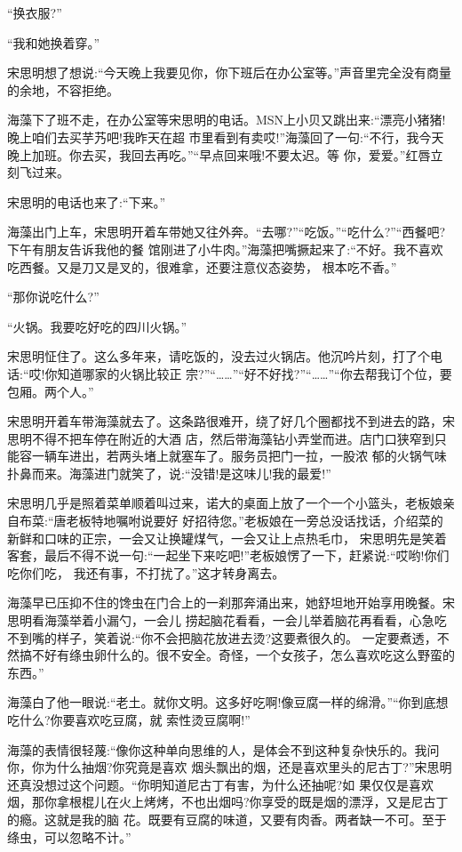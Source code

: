 \documentclass[11pt,a4paper,onecolumn]{article}
\begin{document}
``换衣服?''

``我和她换着穿。''

宋思明想了想说:``今天晚上我要见你，你下班后在办公室等。''声音里完全没有商量的余地，不容拒绝。

海藻下了班不走，在办公室等宋思明的电话。MSN上小贝又跳出来:``漂亮小猪猪!晚上咱们去买芋艿吧!我昨天在超
市里看到有卖哎!''海藻回了一句:``不行，我今天晚上加班。你去买，我回去再吃。''``早点回来哦!不要太迟。等
你，爱爱。''红唇立刻飞过来。

宋思明的电话也来了:``下来。''

海藻出门上车，宋思明开着车带她又往外奔。``去哪?''``吃饭。''``吃什么?''``西餐吧?下午有朋友告诉我他的餐
馆刚进了小牛肉。''海藻把嘴撅起来了:``不好。我不喜欢吃西餐。又是刀又是叉的，很难拿，还要注意仪态姿势，
根本吃不香。''

``那你说吃什么?''

``火锅。我要吃好吃的四川火锅。''

宋思明怔住了。这么多年来，请吃饭的，没去过火锅店。他沉吟片刻，打了个电话:``哎!你知道哪家的火锅比较正
宗?''``……''``好不好找?''``……''``你去帮我订个位，要包厢。两个人。''

宋思明开着车带海藻就去了。这条路很难开，绕了好几个圈都找不到进去的路，宋思明不得不把车停在附近的大酒
店，然后带海藻钻小弄堂而进。店门口狭窄到只能容一辆车进出，若两头堵上就塞车了。服务员把门一拉，一股浓
郁的火锅气味扑鼻而来。海藻进门就笑了，说:``没错!是这味儿!我的最爱!''

宋思明几乎是照着菜单顺着叫过来，诺大的桌面上放了一个一个小篮头，老板娘亲自布菜:``唐老板特地嘱咐说要好
好招待您。''老板娘在一旁总没话找话，介绍菜的新鲜和口味的正宗，一会又让换罐煤气，一会又让上点热毛巾，
宋思明先是笑着客套，最后不得不说一句:``一起坐下来吃吧!''老板娘愣了一下，赶紧说:``哎哟!你们吃你们吃，
我还有事，不打扰了。''这才转身离去。

海藻早已压抑不住的馋虫在门合上的一刹那奔涌出来，她舒坦地开始享用晚餐。宋思明看海藻举着小漏勺，一会儿
捞起脑花看看，一会儿举着脑花再看看，心急吃不到嘴的样子，笑着说:``你不会把脑花放进去烫?这要煮很久的。
一定要煮透，不然搞不好有绦虫卵什么的。很不安全。奇怪，一个女孩子，怎么喜欢吃这么野蛮的东西。''

海藻白了他一眼说:``老土。就你文明。这多好吃啊!像豆腐一样的绵滑。''``你到底想吃什么?你要喜欢吃豆腐，就
索性烫豆腐啊!''

海藻的表情很轻蔑:``像你这种单向思维的人，是体会不到这种复杂快乐的。我问你，你为什么抽烟?你究竟是喜欢
烟头飘出的烟，还是喜欢里头的尼古丁?''宋思明还真没想过这个问题。``你明知道尼古丁有害，为什么还抽呢?如
果仅仅是喜欢烟，那你拿根棍儿在火上烤烤，不也出烟吗?你享受的既是烟的漂浮，又是尼古丁的瘾。这就是我的脑
花。既要有豆腐的味道，又要有肉香。两者缺一不可。至于绦虫，可以忽略不计。''
\end{document}
